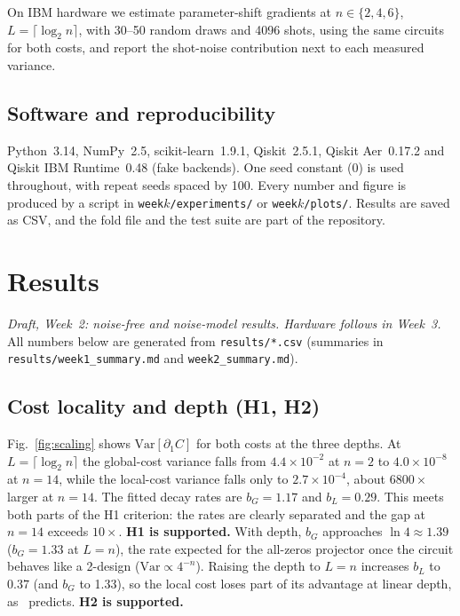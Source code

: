 \documentclass[conference]{IEEEtran}
\newcommand{\Var}{\mathrm{Var}}
\begin{document}
On IBM hardware we estimate parameter-shift gradients at $n\in\{2,4,6\}$,
$L=\lceil\log_2 n\rceil$, with 30--50 random draws and 4096 shots, using
the same circuits for both costs, and report the shot-noise contribution
next to each measured variance.

\subsection{Software and reproducibility}
Python~3.14, NumPy~2.5, scikit-learn~1.9.1, Qiskit~2.5.1, Qiskit
Aer~0.17.2 and Qiskit IBM Runtime~0.48 (fake backends). One seed constant (0) is used throughout, with repeat seeds spaced by
100. Every number and figure is produced by a script in
\texttt{week$k$/experiments/} or \texttt{week$k$/plots/}. Results are saved as CSV, and the
fold file and the test suite are part of the repository.

\section{Results}
\emph{Draft, Week~2: noise-free and noise-model results. Hardware follows in Week~3.}
All numbers below are generated from \texttt{results/*.csv} (summaries in
\texttt{results/week1\_summary.md} and \texttt{week2\_summary.md}).

\subsection{Cost locality and depth (H1, H2)}
Fig.~\ref{fig:scaling} shows $\Var[\partial_1C]$ for both costs at the three
depths. At $L=\lceil\log_2n\rceil$ the global-cost variance falls from
$4.4\times10^{-2}$ at $n=2$ to $4.0\times10^{-8}$ at $n=14$, while the local-cost
variance falls only to $2.7\times10^{-4}$, about $6800\times$ larger at
$n=14$. The fitted decay rates are $b_G=1.17$ and $b_L=0.29$. This meets
both parts of the H1 criterion: the rates are clearly separated and the gap at
$n=14$ exceeds $10\times$. \textbf{H1 is supported.} With depth, $b_G$ approaches $\ln4\approx1.39$
($b_G=1.33$ at $L=n$), the rate expected for the all-zeros projector once the
circuit behaves like a 2-design ($\Var\propto4^{-n}$). Raising the depth to $L=n$ increases $b_L$ to
$0.37$ (and $b_G$ to 1.33), so the local cost loses part of its advantage at
linear depth, as~\cite{cerezo2021} predicts. \textbf{H2 is supported.}
\end{document}
